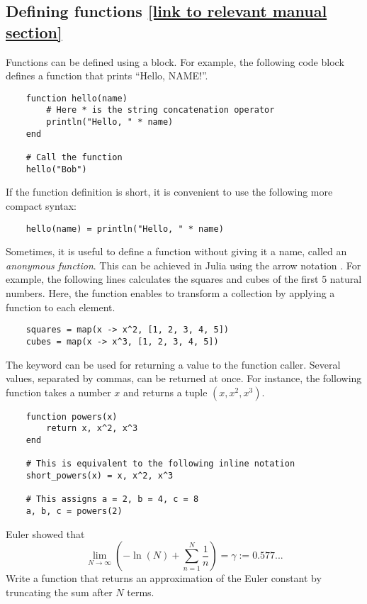 \subsection*{Defining functions {\footnotesize \href{https://docs.julialang.org/en/v1/manual/functions/} {[link to relevant manual section]}}}%
\label{sub:defining_functions}
Functions can be defined using a  block.
For example, the following code block defines a function that prints ``Hello, NAME!''.

\begin{verbatim}
    function hello(name)
        # Here * is the string concatenation operator
        println("Hello, " * name)
    end

    # Call the function
    hello("Bob")
\end{verbatim}

If the function definition is short,
it is convenient to use the following more compact syntax:
\begin{verbatim}
    hello(name) = println("Hello, " * name)
\end{verbatim}

Sometimes, it is useful to define a function without giving it a name, called an \emph{anonymous function}.
This can be achieved in Julia using the arrow notation \julia{->}.
For example, the following lines calculates the squares and cubes of the first 5 natural numbers.
Here, the function  enables to transform a collection by applying a function to each element.
\begin{verbatim}
    squares = map(x -> x^2, [1, 2, 3, 4, 5])
    cubes = map(x -> x^3, [1, 2, 3, 4, 5])
\end{verbatim}

The  keyword can be used for returning a value to the function caller.
Several values, separated by commas, can be returned at once.
For instance, the following function takes a number $x$ and returns a tuple $(x, x^2, x^3)$.
\begin{verbatim}
    function powers(x)
        return x, x^2, x^3
    end

    # This is equivalent to the following inline notation
    short_powers(x) = x, x^2, x^3

    # This assigns a = 2, b = 4, c = 8
    a, b, c = powers(2)
\end{verbatim}

\begin{task}
    Euler showed that
    \[
        \lim_{N \to \infty} \left( - \ln(N) + \sum_{n=1}^{N} \frac{1}{n} \right) = \gamma := 0.577...
    \]
    Write a function  that returns an approximation of the Euler constant by truncating the sum after $N$ terms.
\end{task}

